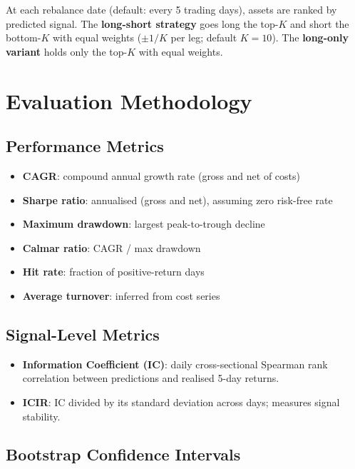 \documentclass[11pt]{article}
\begin{document}
At each rebalance date (default: every 5 trading days), assets are ranked by predicted signal.
The \textbf{long-short strategy} goes long the top-$K$ and short the bottom-$K$ with equal weights ($\pm 1/K$ per leg; default $K=10$).
The \textbf{long-only variant} holds only the top-$K$ with equal weights.


\section{Evaluation Methodology}
\label{sec:evaluation}

\subsection{Performance Metrics}

\begin{itemize}[leftmargin=1.4em]
  \item \textbf{CAGR}: compound annual growth rate (gross and net of costs)
  \item \textbf{Sharpe ratio}: annualised (gross and net), assuming zero risk-free rate
  \item \textbf{Maximum drawdown}: largest peak-to-trough decline
  \item \textbf{Calmar ratio}: CAGR / max drawdown
  \item \textbf{Hit rate}: fraction of positive-return days
  \item \textbf{Average turnover}: inferred from cost series
\end{itemize}

\subsection{Signal-Level Metrics}

\begin{itemize}[leftmargin=1.4em]
  \item \textbf{Information Coefficient (IC)}: daily cross-sectional Spearman rank correlation between predictions and realised 5-day returns.
  \item \textbf{ICIR}: IC divided by its standard deviation across days; measures signal stability.
\end{itemize}

\subsection{Bootstrap Confidence Intervals}
\end{document}
